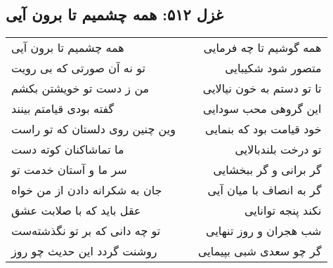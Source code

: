 \begin{center}
\section*{غزل ۵۱۲: همه چشمیم تا برون آیی}
\label{sec:512}
\begin{longtable}{l p{0.5cm} r}
همه چشمیم تا برون آیی
&&
همه گوشیم تا چه فرمایی
\\
تو نه آن صورتی که بی رویت
&&
متصور شود شکیبایی
\\
من ز دست تو خویشتن بکشم
&&
تا تو دستم به خون نیالایی
\\
گفته بودی قیامتم بینند
&&
این گروهی محب سودایی
\\
وین چنین روی دلستان که تو راست
&&
خود قیامت بود که بنمایی
\\
ما تماشاکنان کوته دست
&&
تو درخت بلندبالایی
\\
سر ما و آستان خدمت تو
&&
گر برانی و گر ببخشایی
\\
جان به شکرانه دادن از من خواه
&&
گر به انصاف با میان آیی
\\
عقل باید که با صلابت عشق
&&
نکند پنجه توانایی
\\
تو چه دانی که بر تو نگذشته‌ست
&&
شب هجران و روز تنهایی
\\
روشنت گردد این حدیث چو روز
&&
گر چو سعدی شبی بپیمایی
\\
\end{longtable}
\end{center}
